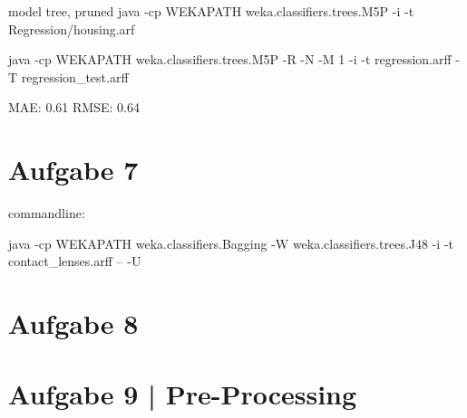 model tree, pruned
java -cp WEKAPATH weka.classifiers.trees.M5P -i -t Regression/housing.arf


java -cp WEKAPATH weka.classifiers.trees.M5P -R -N -M 1 -i -t regression.arff -T regression\_test.arff


MAE: 0.61 
RMSE: 0.64 

\section{Aufgabe 7}
commandline: 

java -cp WEKAPATH weka.classifiers.Bagging -W weka.classifiers.trees.J48 -i -t contact\_lenses.arff -- -U



\section{Aufgabe 8}



\section{Aufgabe 9 | Pre-Processing}




